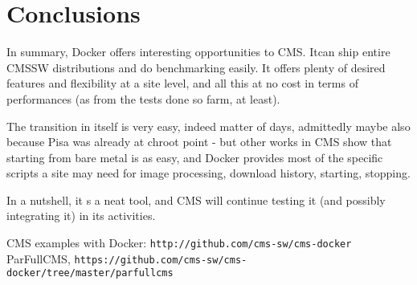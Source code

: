 \documentclass{PoS}
\begin{document}
\section{Conclusions}

In summary, Docker offers interesting opportunities to CMS. Itcan ship entire CMSSW distributions and do benchmarking easily. It offers plenty of desired features and flexibility at a site level, and all this at no cost in terms of performances (as from the tests done so farm, at least).

The transition in itself is very easy, indeed matter of days, admittedly maybe also because Pisa was already at chroot point - but other works in CMS show that starting from bare metal is as easy,    and Docker provides most of the specific scripts a site may need for image processing, download history, starting, stopping.

In a nutshell, it s a neat tool, and CMS will continue testing it (and possibly integrating it) in its activities.

%


\begin{thebibliography}{99}
 CMS examples with Docker: \texttt{http://github.com/cms-sw/cms-docker}
 ParFullCMS, \texttt{https://github.com/cms-sw/cms-docker/tree/master/parfullcms}




\end{thebibliography}
\end{document}
